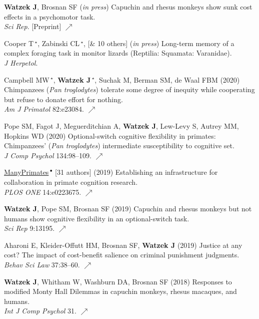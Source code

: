 \documentclass[]{friggeri-cv}
\begin{document}
\begin{enumerate}[label={[\,\arabic*\,]}]
  \item {\textbf{Watzek J}, Brosnan SF (\emph{in press}) Capuchin and rhesus monkeys show sunk cost effects in a psychomotor task. \\\emph{Sci Rep}. [Preprint] \href{https://doi.org/10.31234/osf.io/qtgru}{\small $\nearrow$}}
  \item Cooper T\,{\Large${}^\star$}, Zabinski CL\,{\Large${}^\star$}, [\& 10 others] (\emph{in press}) Long-term memory of a complex foraging task in monitor lizards (Reptilia: Squamata: Varanidae). \\\emph{J Herpetol}.
  \item {Campbell MW\,{\Large${}^\star$}, \textbf{Watzek J\,{\Large${}^\star$}}, Suchak M, Berman SM, de Waal FBM (2020) Chimpanzees (\emph{Pan troglodytes}) tolerate some degree of inequity while cooperating but refuse to donate effort for nothing. \\\emph{Am J Primatol} 82:e23084. \href{https://doi.org/10.1002/ajp.23084}{\small $\nearrow$} }\enlargethispage{1.97\baselineskip}
  \item {Pope SM, Fagot J, Meguerditchian A, \textbf{Watzek J}, Lew-Levy S, Autrey MM, Hopkins WD (2020) Optional-switch cognitive flexibility in primates: Chimpanzees' (\emph{Pan troglodytes}) intermediate susceptibility to cognitive set. \\\emph{J Comp Psychol} 134:98–109. \href{https://doi.org/10.1037/com0000194}{\small $\nearrow$} }
  \item {\ul{ManyPrimates}\,${}^\bullet$ [31 authors] (2019) Establishing an infrastructure for collaboration in primate cognition research. \\\emph{PLOS ONE} 14:e0223675. \href{https://doi.org/10.1371/journal.pone.0223675}{\small $\nearrow$}}
  \item {\textbf{Watzek J}, Pope SM, Brosnan SF (2019) Capuchin and rhesus monkeys but not humans show cognitive flexibility in an optional-switch task. \\\emph{Sci Rep} 9:13195. \href{https://doi.org/10.1038/s41598-019-49658-0}{\small $\nearrow$}}
  \item {Aharoni E, Kleider-Offutt HM, Brosnan SF, \textbf{Watzek J} (2019) Justice at any cost? The impact of cost-benefit salience on criminal punishment judgments. \\\emph{Behav Sci Law} 37:38–60. \href{https://doi.org/10.1002/bsl.2388}{{\small $\nearrow$}}}
  \item {\textbf{Watzek J}, Whitham W, Washburn DA, Brosnan SF (2018) Responses to modified Monty Hall Dilemmas in capuchin monkeys, rhesus macaques, and humans. \\\emph{Int J Comp Psychol} 31. \href{https://escholarship.org/uc/item/1jn0t21r}{\small $\nearrow$}}

\end{enumerate}
\end{document}
